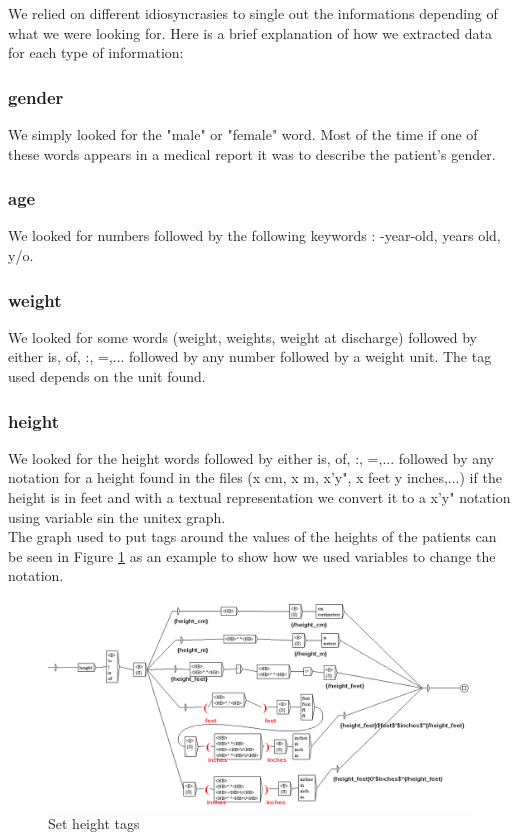 \documentclass{eplDoc}
\begin{document}
We relied on different idiosyncrasies to single out the informations depending of what we were looking for. Here is a brief explanation of how we extracted data for each type of information: 

\subsubsection{gender}
We simply looked for the "male" or "female" word. Most of the time if one of these words appears in a medical report it was to describe the patient's gender. 

\subsubsection{age}

We looked for numbers followed by the following keywords : -year-old, years old, y/o.

\subsubsection{weight}

We looked for some words (weight, weights, weight at discharge) followed by either is, of, :, =,... followed by any number followed by a weight unit. The tag used depends on the unit found. 

\subsubsection{height}

We looked for the height words followed by either is, of, :, =,... followed by any notation for a height found in the files (x cm, x m, x'y", x feet y inches,...) if the height is in feet and with a textual representation we convert it to a x'y" notation using variable sin the unitex graph. \\ 
The graph used to put tags around the values of the heights of the patients can be seen in Figure \ref{gr} as an example to show how we used variables to change the notation.
\FloatBarrier
\begin{figure}%
\includegraphics[width=\columnwidth]{heightgraph.png}%
\caption{Set height tags}%
\label{gr}%
\end{figure}
\FloatBarrier
\end{document}
